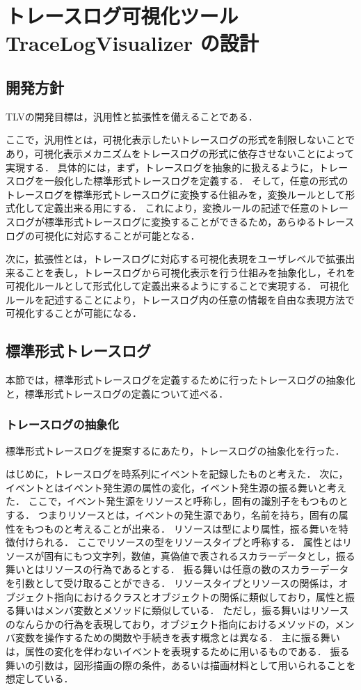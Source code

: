 \chapter{トレースログ可視化ツール TraceLogVisualizer の設計}

\section{開発方針}
TLVの開発目標は，汎用性と拡張性を備えることである．

ここで，汎用性とは，可視化表示したいトレースログの形式を制限しないことであり，可視化表示メカニズムをトレースログの形式に依存させないことによって実現する．
具体的には，まず，トレースログを抽象的に扱えるように，トレースログを一般化した標準形式トレースログを定義する．
そして，任意の形式のトレースログを標準形式トレースログに変換する仕組みを，変換ルールとして形式化して定義出来る用にする．
これにより，変換ルールの記述で任意のトレースログが標準形式トレースログに変換することができるため，あらゆるトレースログの可視化に対応することが可能となる．

次に，拡張性とは，トレースログに対応する可視化表現をユーザレベルで拡張出来ることを表し，トレースログから可視化表示を行う仕組みを抽象化し，それを可視化ルールとして形式化して定義出来るようにすることで実現する．
可視化ルールを記述することにより，トレースログ内の任意の情報を自由な表現方法で可視化することが可能になる．


\section{標準形式トレースログ}

本節では，標準形式トレースログを定義するために行ったトレースログの抽象化と，標準形式トレースログの定義について述べる．

\subsection{トレースログの抽象化}

標準形式トレースログを提案するにあたり，トレースログの抽象化を行った．

はじめに，トレースログを時系列にイベントを記録したものと考えた．
次に，イベントとはイベント発生源の属性の変化，イベント発生源の振る舞いと考えた．
ここで，イベント発生源をリソースと呼称し，固有の識別子をもつものとする．
つまりリソースとは，イベントの発生源であり，名前を持ち，固有の属性をもつものと考えることが出来る．
リソースは型により属性，振る舞いを特徴付けられる．
ここでリソースの型をリソースタイプと呼称する．
属性とはリソースが固有にもつ文字列，数値，真偽値で表されるスカラーデータとし，振る舞いとはリソースの行為であるとする．
振る舞いは任意の数のスカラーデータを引数として受け取ることができる．
リソースタイプとリソースの関係は，オブジェクト指向におけるクラスとオブジェクトの関係に類似しており，属性と振る舞いはメンバ変数とメソッドに類似している．
ただし，振る舞いはリソースのなんらかの行為を表現しており，オブジェクト指向におけるメソッドの，メンバ変数を操作するための関数や手続きを表す概念とは異なる．
主に振る舞いは，属性の変化を伴わないイベントを表現するために用いるものである．
振る舞いの引数は，図形描画の際の条件，あるいは描画材料として用いられることを想定している．

